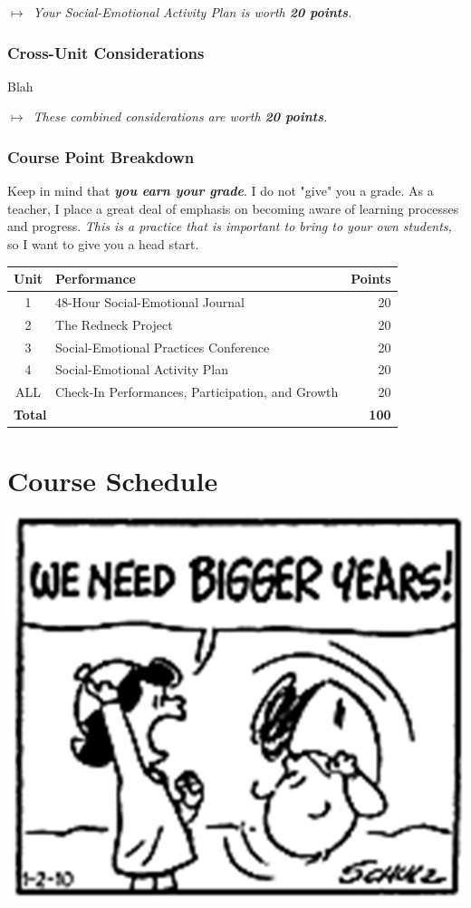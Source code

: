 \documentclass{tufte-handout}
\begin{document}
\medskip\noindent\textit{$\mapsto$~Your Social-Emotional Activity Plan is worth \textbf{20 points}.}

\section{Cross-Unit Considerations}

Blah

\medskip\noindent\textit{$\mapsto$~These combined considerations are worth \textbf{20 points}.}

\section{Course Point Breakdown}

Keep in mind that \emph{\textbf{you earn your grade}}. I do not "give" you a grade. As a teacher, I place a great deal of emphasis on becoming aware of learning processes and progress. \emph{This is a practice that is important to bring to your own students,} so I want to give you a head start.

\bigskip

\begin{tabular}{clr}
	\toprule
	Unit & Performance & Points \\
	\midrule\midrule
	1 & 48-Hour Social-Emotional Journal & 20 \\
	\midrule
	2 & The Redneck Project & 20 \\
	\midrule
	3 & Social-Emotional Practices Conference & 20 \\
	\midrule
	4 & Social-Emotional Activity Plan & 20 \\
	\midrule
	ALL & Check-In Performances, Participation, and Growth & 20 \\
	\midrule\midrule
	\multicolumn{2}{l}{\textbf{Total}} & \textbf{100} \\
	\bottomrule
\end{tabular}

\newpage

\part{\faCalendar\medspace Course Schedule \medspace\faCalendar}

\begin{marginfigure}
	\begin{center}
		\includegraphics[width=0.4\linewidth]{sc-pic.png}
	\end{center}
\end{marginfigure}
\end{document}
